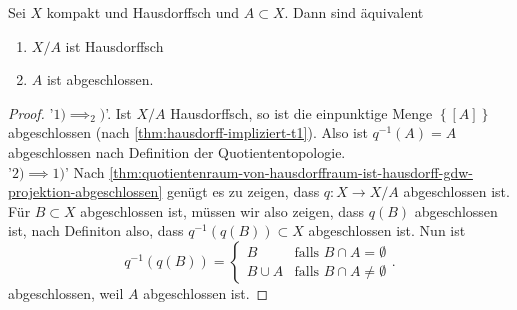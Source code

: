 \begin{corollary}\label{cor:quotientenraum-von-kompaktem-hausdorffraum-mit-teilmenge-ist-hausdorff-gdw-teilmenge-abgeschlossen}
    Sei $X$ kompakt und Hausdorffsch und  $A\subset X$. Dann sind äquivalent
    \begin{enumerate}[1)]
        \item $X / A$ ist Hausdorffsch
        \item  $A$ ist abgeschlossen.
    \end{enumerate}
\end{corollary}
\begin{proof}
    '$1)\implies_2)$'. Ist $X / A$ Hausdorffsch, so ist die einpunktige Menge $\left \{[A]\right\}$ abgeschlossen (nach \autoref{thm:hausdorff-impliziert-t1}). Also ist $q^{-1}(A) = A$ abgeschlossen nach Definition der Quotiententopologie. \\
    '$2)\implies 1)$' Nach \autoref{thm:quotientenraum-von-hausdorffraum-ist-hausdorff-gdw-projektion-abgeschlossen} genügt es zu zeigen, dass $q: X \to  X / A$ abgeschlossen ist. Für $B\subset X$ abgeschlossen ist, müssen wir also zeigen, dass $q(B)$ abgeschlossen ist, nach Definiton also, dass  $q^{-1}(q(B))\subset X$ abgeschlossen ist. Nun ist
    \[
        q^{-1}(q(B)) = \begin{cases}
            B & \text{falls } B\cap A = \emptyset \\
            B \cup A & \text{falls }B \cap  A \neq  \emptyset
        \end{cases}
    .\] 
    abgeschlossen, weil $A$ abgeschlossen ist. 
\end{proof}


